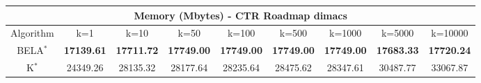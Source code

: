 \begin{tabular}{c|cccccccc}\toprule
\multicolumn{9}{c}{Memory (Mbytes) - CTR Roadmap dimacs}\\ \midrule
Algorithm & k=1 & k=10 & k=50 & k=100 & k=500 & k=1000 & k=5000 & k=10000 \\ \midrule
BELA$^*$ & \textbf{17139.61} & \textbf{17711.72} & \textbf{17749.00} & \textbf{17749.00} & \textbf{17749.00} & \textbf{17749.00} & \textbf{17683.33} & \textbf{17720.24} \\
K$^*$ & 24349.26 & 28135.32 & 28177.64 & 28235.64 & 28475.62 & 28347.61 & 30487.77 & 33067.87 \\ \bottomrule 
\end{tabular}
